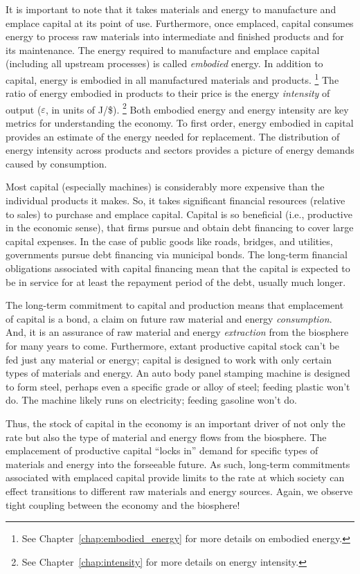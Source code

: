 It is important to note that it takes materials and energy
to manufacture and emplace capital at its point of use.
Furthermore, once emplaced,
capital consumes energy to process raw materials 
into intermediate and finished products
and for its maintenance.
The energy required to manufacture and emplace capital
(including all upstream processes)
is called \emph{embodied} energy.
In addition to capital, energy is embodied in all manufactured materials and
products.%
	\footnote{
	See Chapter~\ref{chap:embodied_energy} for more details
	on embodied energy.
	}
The ratio of energy embodied in products to their price 
is the energy \emph{intensity} of output ($\varepsilon$, 
in units of J/\$).%
	\footnote{
	See Chapter~\ref{chap:intensity} for more details 
	on energy intensity.
	}
Both embodied energy and energy intensity are key metrics 
for understanding the economy.
To first order, energy embodied in capital provides an estimate of the 
energy needed for replacement.
The distribution of energy intensity
across products and sectors
provides a picture of energy demands caused by consumption.

Most capital (especially machines) is considerably more expensive
than the individual products it makes.
So, it takes significant financial resources (relative to sales) 
to purchase and emplace capital.
Capital is so beneficial (i.e., productive in the economic sense), 
that firms pursue and obtain debt financing to cover large capital expenses.
In the case of public goods like roads, bridges, and utilities,
governments pursue debt financing via municipal bonds.
The long-term financial obligations associated with capital financing 
mean that the capital is expected to be in service
for at least the repayment period of the debt,
usually much longer.

The long-term commitment to capital and production means that 
emplacement of capital is a bond, a claim on future
raw material and energy \emph{consumption}.
And, it is an assurance of raw material and energy \emph{extraction} 
from the biosphere for many years to come.
Furthermore, extant productive capital stock can't be fed just any material or energy;
capital is designed to work with only certain types of materials and energy.
An auto body panel stamping machine is designed to form steel, perhaps even a specific 
grade or alloy of steel;
feeding plastic won't do.
The machine likely runs on electricity; 
feeding gasoline won't do.

Thus, the stock of capital in the economy 
is an important driver of not only 
the rate but also  
the type of
material and energy flows from the biosphere.
The emplacement of productive capital
``locks in'' demand for specific types of materials and energy 
into the forseeable future.
As such, long-term commitments associated with emplaced capital
provide limits to the rate at which society can effect
transitions to different raw materials and energy sources.
Again, we observe tight coupling between the economy and the biosphere!

